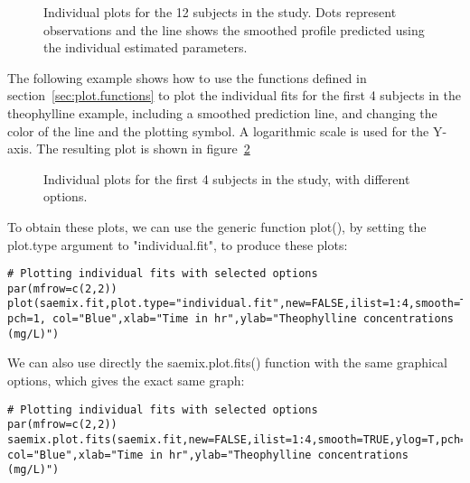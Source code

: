 {\begin{figure}[!h]
\begin{center}
\par \kern -1cm
\end{center}
\par \kern -0.8cm
\caption{Individual plots for the 12 subjects in the study. Dots represent observations and the line shows the smoothed profile predicted using the individual estimated parameters.} \label{fig:theoindividual}
\end{figure}

\clearpage
\newpage

\bigskip
The following example shows how to use the functions defined in section~\ref{sec:plot.functions} to plot the individual fits for the first 4 subjects in the theophylline example, including a smoothed prediction line, and changing the color of the line and the plotting symbol. A logarithmic scale is used for the Y-axis. The resulting plot is shown in figure~\ref{fig:theoindopt}
\begin{figure}[!h]
\begin{center}
\end{center}
\par \kern -0.5cm
\caption{Individual plots for the first 4 subjects in the study, with different options.} \label{fig:theoindopt}
\end{figure}

To obtain these plots, we can use the generic function {\sf plot()}, by setting the {\sf plot.type} argument to "individual.fit", to produce these plots:
\begin{verbatim}
# Plotting individual fits with selected options
par(mfrow=c(2,2))
plot(saemix.fit,plot.type="individual.fit",new=FALSE,ilist=1:4,smooth=TRUE,ylog=T,
pch=1, col="Blue",xlab="Time in hr",ylab="Theophylline concentrations (mg/L)")
\end{verbatim}
We can also use directly the {\sf saemix.plot.fits()} function with the same graphical options, which gives the exact same graph:
\begin{verbatim}
# Plotting individual fits with selected options
par(mfrow=c(2,2))
saemix.plot.fits(saemix.fit,new=FALSE,ilist=1:4,smooth=TRUE,ylog=T,pch=1,
col="Blue",xlab="Time in hr",ylab="Theophylline concentrations (mg/L)")
\end{verbatim}

}
